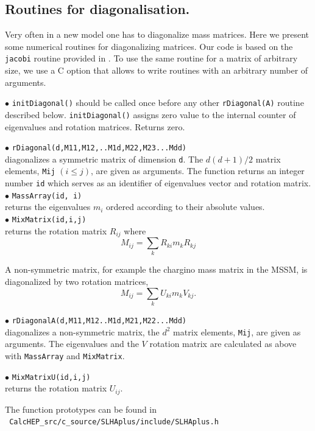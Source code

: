 \documentclass[12pt,a4paper]{article}
\begin{document}
\subsection{Routines for diagonalisation.}

Very often in a new model  one has to diagonalize 
mass matrices. Here we present some numerical routines for 
diagonalizing matrices. Our code is based on the \verb|jacobi| routine provided in 
 \cite{Numerical}. To use the same routine for a matrix of arbitrary size, we 
use a C option that allows to write routines with an arbitrary number of arguments. 

\noindent 
$\bullet$ \verb|initDiagonal()| should be called once  before any other 
\verb|rDiagonal(A)| routine described below. \verb|initDiagonal()| assigns zero value 
to the internal counter of  eigenvalues and rotation matrices. Returns zero.

\noindent
$\bullet$ \verb|rDiagonal(d,M11,M12,..M1d,M22,M23...Mdd)|\\
diagonalizes a symmetric matrix of dimension \verb|d|. The  
$d(d+1)/2$  matrix elements, \verb|Mij| $(i\le j)$, are given as arguments.
The function returns an integer number \verb|id| which serves as an  identifier 
of eigenvalues vector and rotation matrix.\\
\noindent
$\bullet$ \verb|MassArray(id, i)|\\ returns the eigenvalues  $m_i$ ordered according to 
their absolute values. \\
\noindent
$\bullet$ \verb|MixMatrix(id,i,j)|\\ returns the rotation matrix  $R_{ij}$ where
$$  M_{ij} = \sum\limits_k  R_{ki} m_k R_{kj}$$

A non-symmetric matrix, for example the 
chargino mass matrix in the  MSSM, is diagonalized by  two rotation matrices,
$$  M_{ij} = \sum\limits_k  U_{ki} m_k V_{kj}.$$ 

\noindent
$\bullet$ \verb|rDiagonalA(d,M11,M12..M1d,M21,M22...Mdd)|\\ 
diagonalizes a non-symmetric matrix, the $d^2$  matrix elements, \verb|Mij|, are given as arguments.
The eigenvalues and the $V$ rotation matrix are calculated as above with 
\verb|MassArray| and \verb|MixMatrix|. 

\noindent
$\bullet$ \verb|MixMatrixU(id,i,j)|\\
returns the rotation matrix $U_{ij}$.

The function prototypes can be found in \\
\noindent
\verb| CalcHEP_src/c_source/SLHAplus/include/SLHAplus.h|
\end{document}
